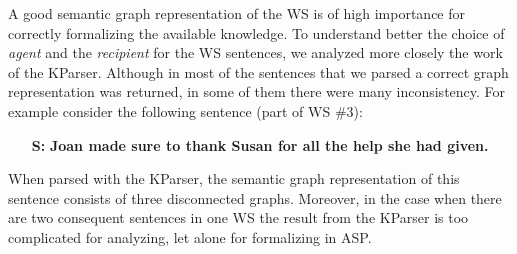 A good semantic graph representation of the WS is of high importance for correctly formalizing the available knowledge. To understand better the choice of \textit{agent} and the \textit{recipient} for the WS sentences, we analyzed more closely the work of the KParser. Although in most of the sentences that we parsed a correct graph representation was returned, in some of them there were many inconsistency. For example consider the following sentence (part of WS \#3):
\begin{itemize}
	\item[\textbf{S:}] \textbf{Joan made sure to thank Susan for all the help she had given.}
\end{itemize}
When parsed with the KParser, the semantic graph representation of this sentence consists of three disconnected graphs. Moreover, in the case when there are two consequent sentences in one WS the result from the KParser is too complicated for analyzing, let alone for formalizing in ASP. 



